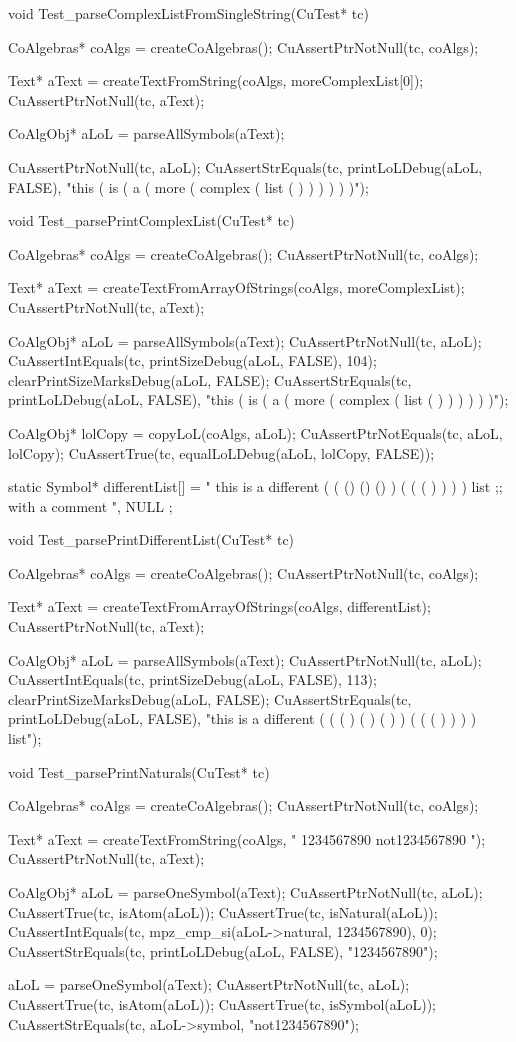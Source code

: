 void Test_parseComplexListFromSingleString(CuTest* tc) {
  CoAlgebras* coAlgs = createCoAlgebras();
  CuAssertPtrNotNull(tc, coAlgs);

  Text* aText = createTextFromString(coAlgs, moreComplexList[0]);
  CuAssertPtrNotNull(tc, aText);

  CoAlgObj* aLoL = parseAllSymbols(aText);

  CuAssertPtrNotNull(tc, aLoL);
  CuAssertStrEquals(tc, printLoLDebug(aLoL, FALSE),
    "this ( is ( a ( more ( complex ( list ( ) ) ) ) ) )");
}

void Test_parsePrintComplexList(CuTest* tc) {
  CoAlgebras* coAlgs = createCoAlgebras();
  CuAssertPtrNotNull(tc, coAlgs);

  Text* aText = createTextFromArrayOfStrings(coAlgs, moreComplexList);
  CuAssertPtrNotNull(tc, aText);

  CoAlgObj* aLoL = parseAllSymbols(aText);
  CuAssertPtrNotNull(tc, aLoL);
  CuAssertIntEquals(tc, printSizeDebug(aLoL, FALSE), 104);
  clearPrintSizeMarksDebug(aLoL, FALSE);
  CuAssertStrEquals(tc, printLoLDebug(aLoL, FALSE),
    "this ( is ( a ( more ( complex ( list ( ) ) ) ) ) )");

  CoAlgObj* lolCopy = copyLoL(coAlgs, aLoL);
  CuAssertPtrNotEquals(tc, aLoL, lolCopy);
  CuAssertTrue(tc, equalLoLDebug(aLoL, lolCopy, FALSE));
}

static Symbol* differentList[] = {
 " this is  a different ( ( () () () ) ( ( ( ) ) ) ) list ;; with a comment  ",
 NULL
};

void Test_parsePrintDifferentList(CuTest* tc) {
  CoAlgebras* coAlgs = createCoAlgebras();
  CuAssertPtrNotNull(tc, coAlgs);

  Text* aText = createTextFromArrayOfStrings(coAlgs, differentList);
  CuAssertPtrNotNull(tc, aText);

  CoAlgObj* aLoL = parseAllSymbols(aText);
  CuAssertPtrNotNull(tc, aLoL);
  CuAssertIntEquals(tc, printSizeDebug(aLoL, FALSE), 113);
  clearPrintSizeMarksDebug(aLoL, FALSE);
  CuAssertStrEquals(tc, printLoLDebug(aLoL, FALSE),
    "this is a different ( ( ( ) ( ) ( ) ) ( ( ( ) ) ) ) list");
}

void Test_parsePrintNaturals(CuTest* tc) {
  CoAlgebras* coAlgs = createCoAlgebras();
  CuAssertPtrNotNull(tc, coAlgs);

  Text* aText = createTextFromString(coAlgs, " 1234567890 not1234567890 ");
  CuAssertPtrNotNull(tc, aText);

  CoAlgObj* aLoL = parseOneSymbol(aText);
  CuAssertPtrNotNull(tc, aLoL);
  CuAssertTrue(tc, isAtom(aLoL));
  CuAssertTrue(tc, isNatural(aLoL));
  CuAssertIntEquals(tc,  mpz_cmp_si(aLoL->natural, 1234567890), 0);
  CuAssertStrEquals(tc, printLoLDebug(aLoL, FALSE), "1234567890");

  aLoL = parseOneSymbol(aText);
  CuAssertPtrNotNull(tc, aLoL);
  CuAssertTrue(tc, isAtom(aLoL));
  CuAssertTrue(tc, isSymbol(aLoL));
  CuAssertStrEquals(tc, aLoL->symbol, "not1234567890");
}

